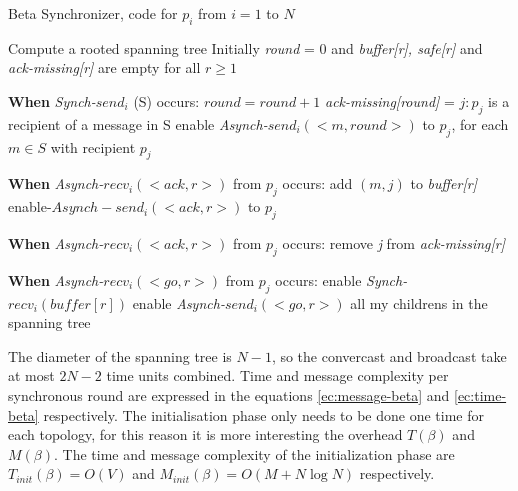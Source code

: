 \begin{algorithm}
 \caption{Beta Synchronizer, code for $p_i$ from $i = 1$ to $N$}
 \label{algorithm:beta} 

\SetAlgoNoLine

Compute a rooted spanning tree
Initially \textit{round} = 0 and \newline
\textit{buffer[r], safe[r]} and \textit{ack-missing[r]} are empty for all $r \geq 1$ \newline

\textbf{When} \textit{Synch-}$send_i$ (S) occurs:\newline
$round = round + 1$ \newline
\textit{ack-missing[round]} = {$j:p_j$ is a recipient of a message in S} \newline
enable \textit{Asynch-}$send_i(<m,round>)$  to $p_j$, for each $m \in S$ with recipient $p_j$ \newline

\textbf{When} \textit{Asynch-}$recv_i(<ack,r>)$ from $p_j$ occurs: \newline
add $(m,j)$ to \textit{buffer[r]} \newline
enable-$Asynch-send_i(<ack,r>)$ to $p_j$ \newline

\textbf{When} \textit{Asynch-}$recv_i(<ack,r>)$ from $p_j$ occurs: \newline
remove \textit{j} from \textit{ack-missing[r]} \newline
{}

\textbf{When} \textit{Asynch-}$recv_i(<go,r>)$ from $p_j$ occurs: \newline
  enable \textit{Synch-}$recv_i(buffer[r])$ \newline
  enable \textit{Asynch-}$send_i(<go,r>)$ all my childrens in the spanning tree \newline

\end{algorithm}

The diameter of the spanning tree is $N - 1$, so the convercast and broadcast take at most $2N - 2$ time units combined. Time and message  complexity per synchronous round are expressed in the equations \ref{ec:message-beta} and \ref{ec:time-beta} respectively. The initialisation phase only needs to be done one time for each topology, for this reason it is more interesting the overhead $T(\beta)$ and $M(\beta)$. The time and message complexity of the initialization phase are $T_{init}(\beta) = O(V)$ and $M_{init}(\beta) = O(M + N \log N)$  respectively.

